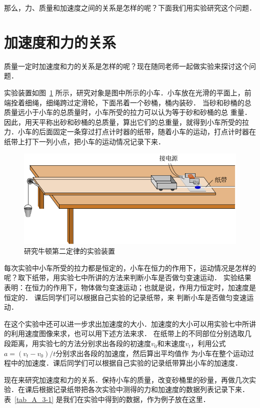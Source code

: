那么，力、质量和加速度之间的关系是怎样的呢？下面我们用实验研究这个问题．


\section{加速度和力的关系}\label{sec-A-3-relationship-between-acceleration-and-force}
质量一定时加速度和力的关系是怎样的呢？现在随同老师一起做实验来探讨这个问题．

实验装置如图~\ref{fig_A_3-3} 所示，研究对象是图中所示的小车．小车放在光滑的平面上，前端拴着细绳，细绳跨过定滑轮，下面吊着一个砂桶，桶内装砂．
当砂和砂桶的总质量远小于小车的总质量时，小车所受的拉力可以认为等于砂和砂桶的总
重量．因此，用天平称出砂和砂桶的总质量，算出它们的总重量，就得到小车所受的拉力．小车的后面固定一条穿过打点计时器的纸带，随着小车的运动，打点计时器在纸带上打下一列小点，把小车的运动情况记录下来．

\begin{figure}[htbp]
    \centering
    \includegraphics{fig/A/3-3.pdf}
    \caption{研究牛顿第二定律的实验装置}\label{fig_A_3-3}
\end{figure}

每次实验中小车所受的拉力都是恒定的，小车在恒力的作用下，运动情况是怎样的呢？取下纸带，用实验七中所讲的方法来判断小车是否做匀变速运动．
实验结果表明：在恒力的作用下，物体做匀变速运动；也就是说，作用力恒定时，加速度是恒定的．
课后同学们可以根据自己实验的记录纸带，来
判断小车是否做匀变速运动．

在这个实验中还可以进一步求出加速度的大小．加速度的大小可以用实验七中所讲的利用速度图像来求，也可以用下述方法来求．
在纸带上的不同部位分别选取几段距离，用实验七的方法分别求出各段的初速度$v_0$和末速度$v_t$，利用公式$a=(v_t-v_0)/t$分别求出各段的加速度，然后算出平均值作
为小车在整个运动过程中的加速度．课后同学们可以根据自己实验的记录纸带算出小车的加速度．

现在来研究加速度和力的关系．保持小车的质量，改变砂桶里的砂量，再做几次实验．在课后根据记录纸带把各次实验中测得的力和加速度的数据列表记录下来．
表~\ref{tab_A_3-1} 是我们在实验中得到的数据，作为例子放在这里．



